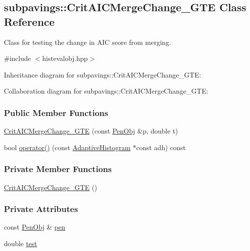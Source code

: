 \hypertarget{classsubpavings_1_1CritAICMergeChange__GTE}{\subsection{subpavings\-:\-:\-Crit\-A\-I\-C\-Merge\-Change\-\_\-\-G\-T\-E \-Class \-Reference}
\label{classsubpavings_1_1CritAICMergeChange__GTE}
}


\-Class for testing the change in \-A\-I\-C score from merging.  




{\ttfamily \#include $<$histevalobj.\-hpp$>$}



\-Inheritance diagram for subpavings\-:\-:\-Crit\-A\-I\-C\-Merge\-Change\-\_\-\-G\-T\-E\-:


\-Collaboration diagram for subpavings\-:\-:\-Crit\-A\-I\-C\-Merge\-Change\-\_\-\-G\-T\-E\-:
\subsubsection*{\-Public \-Member \-Functions}
\begin{DoxyCompactItemize}
\item 
\hyperlink{classsubpavings_1_1CritAICMergeChange__GTE_a70eeeb230b8096bd387d4b706c15f185}{\-Crit\-A\-I\-C\-Merge\-Change\-\_\-\-G\-T\-E} (const \hyperlink{classsubpavings_1_1PenObj}{\-Pen\-Obj} \&p, double t)
\item 
bool \hyperlink{classsubpavings_1_1CritAICMergeChange__GTE_abcd88342d6ebe8ae0eac08a834ac1bc5}{operator()} (const \hyperlink{classsubpavings_1_1AdaptiveHistogram}{\-Adaptive\-Histogram} $\ast$const adh) const 
\end{DoxyCompactItemize}
\subsubsection*{\-Private \-Member \-Functions}
\begin{DoxyCompactItemize}
\item 
\hyperlink{classsubpavings_1_1CritAICMergeChange__GTE_a909ca2dd9ac2f52d1ff26ddfc35ad541}{\-Crit\-A\-I\-C\-Merge\-Change\-\_\-\-G\-T\-E} ()
\end{DoxyCompactItemize}
\subsubsection*{\-Private \-Attributes}
\begin{DoxyCompactItemize}
\item 
const \hyperlink{classsubpavings_1_1PenObj}{\-Pen\-Obj} \& \hyperlink{classsubpavings_1_1CritAICMergeChange__GTE_a4e6ff8fc5fd0b8bfef238e5f48875e42}{pen}
\item 
double \hyperlink{classsubpavings_1_1CritAICMergeChange__GTE_a6ddac11ad1ab2730eff435a1ebbb6c6b}{test}
\end{DoxyCompactItemize}


